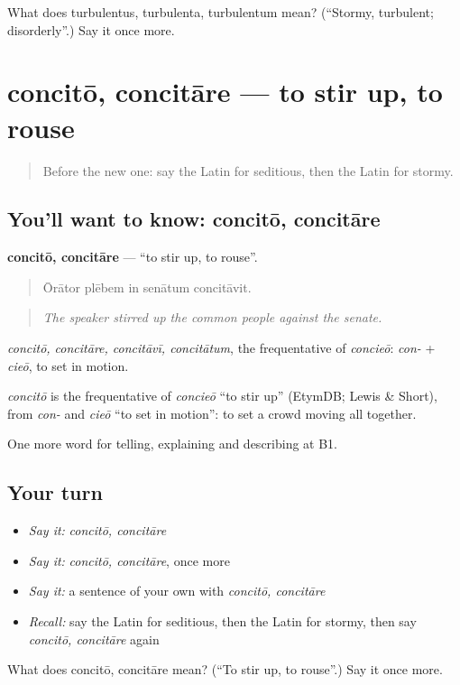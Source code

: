 \begin{tcolorbox}[breakable,colback=teal!4,colframe=teal!35!black,title={Before you move on}]
What does turbulentus, turbulenta, turbulentum mean? (\textquotedblleft{}Stormy, turbulent; disorderly\textquotedblright{}.) Say it once more.
\end{tcolorbox}
\section[concitō, concitāre]{concitō, concitāre — to stir up, to rouse}

\label{lesson:LA-C387-concito}



\begin{quote}
Before the new one: say the Latin for seditious, then the Latin for stormy.
\end{quote}

\subsection*{You'll want to know: concitō, concitāre}
\textbf{concitō, concitāre} — \textquotedblleft{}to stir up, to rouse\textquotedblright{}.

\begin{quote}
Ōrātor plēbem in senātum concitāvit.
\end{quote}

\begin{quote}
\emph{The speaker stirred up the common people against the senate.}
\end{quote}

\emph{concitō, concitāre, concitāvī, concitātum}, the frequentative of \emph{concieō}: \emph{con-} + \emph{cieō}, to set in motion.

\begin{cousinweb}
\emph{concitō} is the frequentative of \emph{concieō} \textquotedblleft{}to stir up\textquotedblright{} (EtymDB; Lewis \& Short), from \emph{con-} and \emph{cieō} \textquotedblleft{}to set in motion\textquotedblright{}: to set a crowd moving all together.
\end{cousinweb}

\begin{grammarlens}[title={What you've built}]
One more word for telling, explaining and describing at B1.
\end{grammarlens}

\subsection*{Your turn}
\begin{itemize}
\raggedright
  \item \emph{Say it:} \emph{concitō, concitāre}
  \item \emph{Say it:} \emph{concitō, concitāre}, once more
  \item \emph{Say it:} a sentence of your own with \emph{concitō, concitāre}
  \item \emph{Recall:} say the Latin for seditious, then the Latin for stormy, then say \emph{concitō, concitāre} again
\end{itemize}

\begin{tcolorbox}[breakable,colback=teal!4,colframe=teal!35!black,title={Before you move on}]
What does concitō, concitāre mean? (\textquotedblleft{}To stir up, to rouse\textquotedblright{}.) Say it once more.
\end{tcolorbox}
